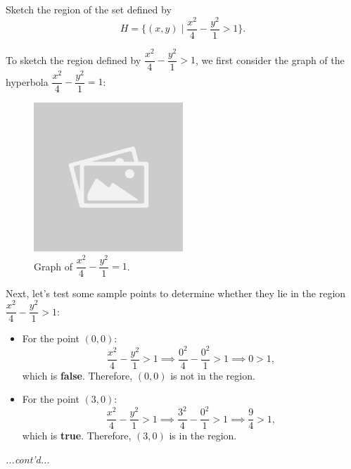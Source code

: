 \documentclass{article}
\begin{document}
\begin{examplebox}
Sketch the region of the set defined by
\[
    H = \{ (x, y) \mid \dfrac{x^2}{4} - \dfrac{y^2}{1} > 1 \}.
\]

\begin{remarkbox}
    To sketch the region defined by \( \dfrac{x^2}{4} - \dfrac{y^2}{1} > 1 \), we first consider the graph of the hyperbola \( \dfrac{x^2}{4} - \dfrac{y^2}{1} = 1 \):

    \begin{figure}[H]
        \centering
        \includegraphics[width=0.5\textwidth]{sample_image.jpg}
        \caption{Graph of \( \dfrac{x^2}{4} - \dfrac{y^2}{1} = 1 \).}
        \label{fig:hyperbola_graph}
    \end{figure}

    Next, let’s test some sample points to determine whether they lie in the region \( \dfrac{x^2}{4} - \dfrac{y^2}{1} > 1 \):

    \begin{itemize}
        \item For the point \( (0, 0) \):
        \[
        \dfrac{x^2}{4} - \dfrac{y^2}{1} > 1 \implies \dfrac{0^2}{4} - \dfrac{0^2}{1} > 1 \implies 0 > 1,
        \]
        which is \textbf{false}. Therefore, \( (0,0) \) is not in the region.

        \item For the point \( (3, 0) \):
        \[
        \dfrac{x^2}{4} - \dfrac{y^2}{1} > 1 \implies \dfrac{3^2}{4} - \dfrac{0^2}{1} > 1 \implies \dfrac{9}{4} > 1,
        \]
        which is \textbf{true}. Therefore, \( (3,0) \) is in the region.
    \end{itemize}
\end{remarkbox}

\textit{...cont'd...}
\end{examplebox}
\end{document}
